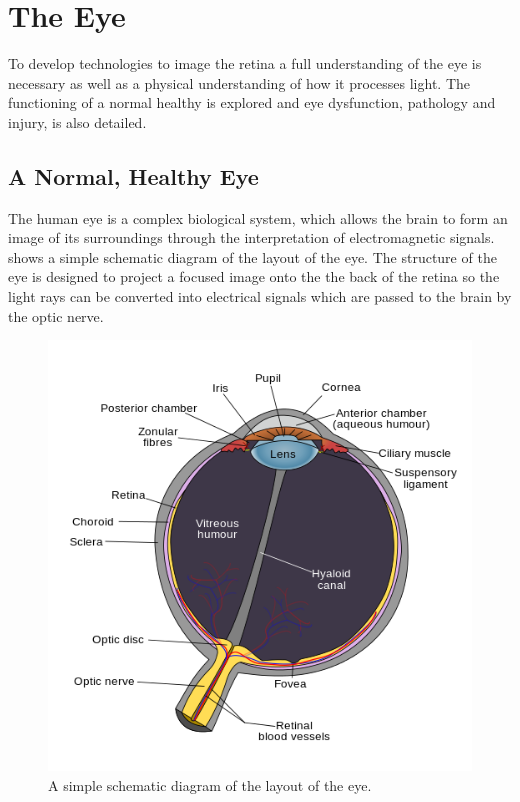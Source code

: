
\chapter{The Eye}

\label{anatomy}

To develop technologies to image the retina a full understanding of the eye is
necessary as well as a physical understanding of how it processes light. The
functioning of a normal healthy is explored and eye dysfunction, pathology and
injury, is also detailed.

\section{A Normal, Healthy Eye}

The human eye is a complex biological system, which allows the brain to
form an image of its surroundings through the interpretation of
electromagnetic signals.  shows a simple schematic
diagram of the layout of the eye. The structure of the eye is designed to
project a focused image onto the the back of the retina so the light rays
can be converted into electrical signals which are passed to the brain by
the optic nerve.

\begin{figure}[H]
\centering
  \includegraphics{figures/schematic_diagram_of_the_human_eye}
\caption{A simple schematic diagram of the layout of the eye.\cite{wikiRhcastilhos}}
\label{fig:eye_simple}
\end{figure}

